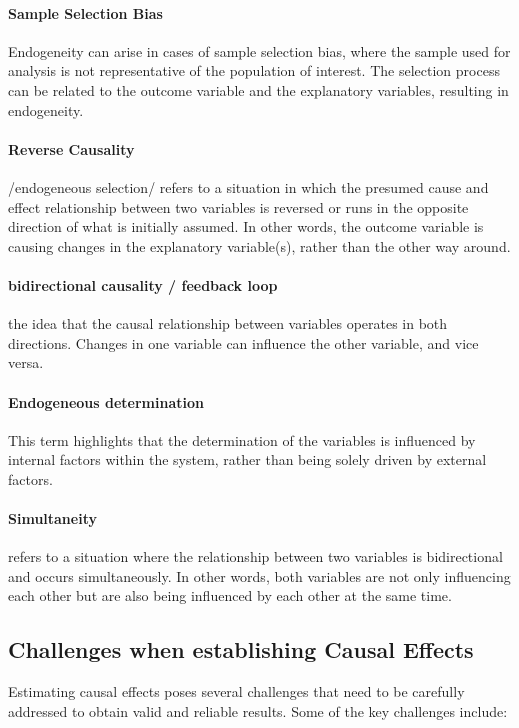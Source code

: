 \documentclass[a3paper, 8pt]{extarticle}
\begin{document}
\begin{multicols*}{5}
\paragraph{Sample Selection Bias} Endogeneity can arise in cases of sample selection bias, where the sample used for analysis is not representative of the population of interest. The selection process can be related to the outcome variable and the explanatory variables, resulting in endogeneity.

\paragraph{Reverse Causality} /endogeneous selection/ refers to a situation in which the  presumed cause and effect relationship between two variables is reversed or runs in the opposite direction of what is initially assumed. In other words, the outcome variable is causing changes in the explanatory variable(s), rather than the other way around.

\paragraph{bidirectional causality / feedback loop}  the idea that the causal relationship between variables operates in both directions. Changes in one variable can influence the other variable, and vice versa.

\paragraph{Endogeneous determination} This term highlights that the determination of the variables is influenced by internal factors within the system, rather than being solely driven by external factors.

\paragraph{Simultaneity}
 refers to a situation where the relationship between two variables is bidirectional and occurs simultaneously. In other words, both variables are not only influencing each other but are also being influenced by each other at the same time.
 
\subsection{Challenges when establishing Causal Effects}

Estimating causal effects poses several challenges that need to be carefully addressed to obtain valid and reliable results. Some of the key challenges include:


\end{multicols*}
\end{document}

